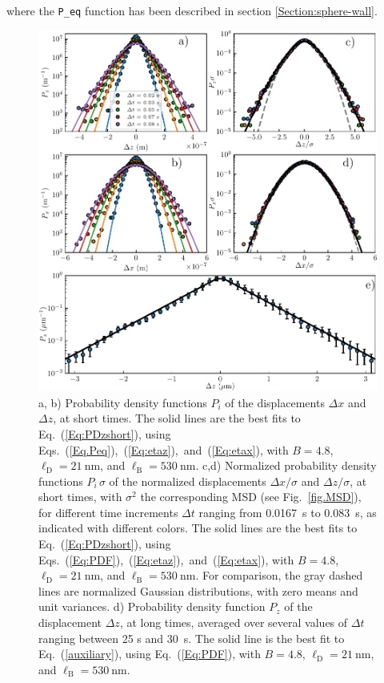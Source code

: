 where the \texttt{P_eq} function has been described in section \ref{Section:sphere-wall}. 


\begin{figure}[H]
	\centering
	\includegraphics{02_body/chapter3/images/trajctory_analysis/P_displacement.pdf}
	\caption{a, b) Probability density functions $P_i$ of the displacements $\Delta x$ and $\Delta z$, at short times. The solid lines are the best fits to Eq.~(\ref{Eq:PDzshort}), using Eqs.~(\ref{Eq.Peq}),~(\ref{Eq:etaz}),~and~(\ref{Eq:etax}), with $B = 4.8$, $\ell_\mathrm{D} = 21 ~ \mathrm{nm}$, and $\ell_\mathrm{B} = 530~\mathrm{nm}$. c,d) Normalized probability density functions $P_i\,\sigma$ of the normalized displacements $\Delta x/\sigma$ and $\Delta z/\sigma$, at short times, with $\sigma^2$ the corresponding MSD (see Fig.~\ref{fig.MSD}), for different time increments $\Delta t$ ranging from 0.0167~s to 0.083~s, as indicated with different colors. The solid lines are the best fits to Eq.~(\ref{Eq:PDzshort}), using Eqs.~(\ref{Eq:PDF}),~(\ref{Eq:etaz}),~and~(\ref{Eq:etax}), with $B = 4.8$, $\ell_\mathrm{D} = 21 ~ \mathrm{nm}$, and $\ell_\mathrm{B} = 530~\mathrm{nm}$. For comparison, the gray dashed lines are normalized Gaussian distributions, with zero means and unit variances. d) Probability density function $P_z$ of the displacement $\Delta z$, at long times, averaged over several values of $\Delta t$ ranging between 25 s and 30~s. The solid line is the best fit to Eq.~(\ref{auxiliary}), using Eq.~(\ref{Eq:PDF}), with $B = 4.8$, $\ell_\mathrm{D} = 21 ~ \mathrm{nm}$, and $\ell_\mathrm{B} = 530~\mathrm{nm}$.}
	\label{fig.displacement}
\end{figure}



